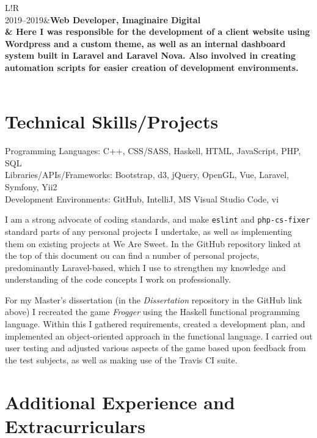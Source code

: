 \documentclass[10pt]{article}
\newcommand\VRule{\color{lightgray}\vrule width 0.5pt}
\begin{document}
\begin{longtable}{L!{\VRule}R}
   \\

  2019--2019&\bf Web Developer, Imaginaire Digital\\
    & Here I was responsible for the development of a client website using Wordpress and a custom theme, as well as an internal dashboard system built in Laravel and Laravel Nova. Also involved in creating automation scripts for easier creation of development environments.\\

    \\

\end{longtable}

\section*{Technical Skills/Projects}

Programming Languages: C++, CSS/SASS, Haskell, HTML, JavaScript, PHP, SQL\\
Libraries/APIs/Frameworks: Bootstrap, d3, jQuery, OpenGL, Vue, Laravel, Symfony, Yii2\\
Development Environments: GitHub, IntelliJ, MS Visual Studio Code, vi

\vskip 5mm

I am a strong advocate of coding standards, and make \verb|eslint| and \verb|php-cs-fixer| standard parts of any personal projects I undertake, as well as implementing them on existing projects at We Are Sweet.
In the GitHub repository linked at the top of this document ou can find a number of personal projects, predominantly Laravel-based, which I use to strengthen my knowledge and understanding of the code concepts I work on professionally.

\par

For my Master's dissertation (in the \emph{Dissertation} repository in the GitHub link above) I recreated the game \emph{Frogger} using the Haskell functional programming language.
Within this I gathered requirements, created a development plan, and implemented an object-oriented approach in the functional language.
I carried out user testing and adjusted various aspects of the game based upon feedback from the test subjects, as well as making use of the Travis CI suite.

\section*{Additional Experience and Extracurriculars}
\end{document}
